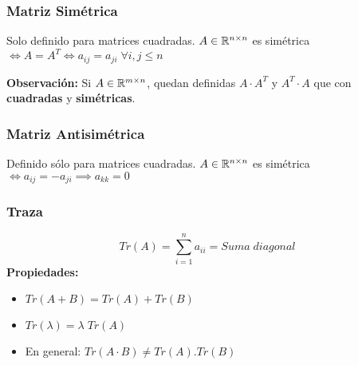 \subsubsection*{Matriz Simétrica}
Solo definido para matrices cuadradas. \(A \in \mathbb{R}^{n \times n}\) es simétrica \(\iff A= A^T \iff a_{ij} = a_{ji} \; \forall i,j \leq n\)

\textbf{Observación:} Si \(A \in \mathbb{R} ^{m \times n}\), quedan definidas \(A \cdot A^T\) y \(A^T \cdot A\) que con \textbf{cuadradas} y \textbf{simétricas}.
\subsubsection*{Matriz Antisimétrica}
Definido sólo para matrices cuadradas. \(A \in \mathbb{R}^{n \times n}\)  es simétrica \(\iff a_{ij} = - a_{ji} \implies a_{kk} = 0\)
\subsubsection*{Traza}
\[Tr(A) = \sum_{i=1}^n a_{ii} = Suma \; diagonal\]
\textbf{Propiedades:}
\begin{itemize}
    \item \(Tr(A+B) = Tr(A) + Tr(B)\)
    \item  \(Tr(\lambda) = \lambda \; Tr(A)\)
    \item En general: \(Tr(A \cdot B) \neq Tr(A).Tr(B)\)
\end{itemize}
